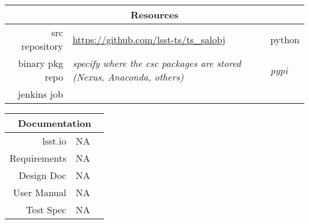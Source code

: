 \begin{longtable}[]{rll}
\hline
\multicolumn{3}{c}{\textbf{Resources}} \\ \hline
src repository & \url{https://github.com/lsst-ts/ts_salobj} & python \\ \hline
binary pkg repo   & \textit{specify where the csc packages are stored (Nexus, Anaconda, others)} & \textit{pypi}\\ \hline
\hline
jenkins job    & & \\ \hline
\end{longtable}

\begin{longtable}[]{rll}
\hline
\multicolumn{3}{c}{\textbf{Documentation}} \\ \hline
lsst.io & NA & \\ \hline
Requirements & NA & \\ \hline
Design Doc & NA & \\ \hline
User Manual & NA & \\ \hline
Test Spec & NA & \\ \hline
\end{longtable}

